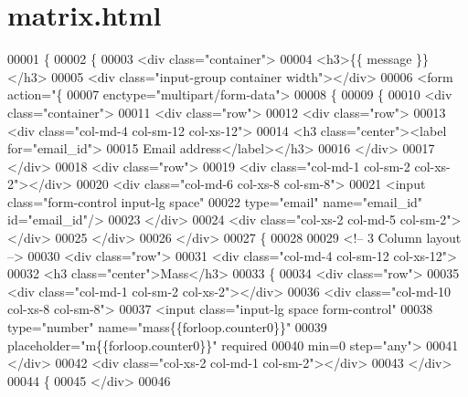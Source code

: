 \hypertarget{matrix_8html_source}{}\section{matrix.\+html}
\label{matrix_8html_source}

\begin{DoxyCode}
00001 \{%
00002 \{%
00003 <div class="container">
00004 <h3>\{\{ message \}\}</h3>
00005 <div class="input-group container width"></div>
00006 <form action="\{%
00007     enctype="multipart/form-data">
00008     \{%
00009     \{%
00010         <div class="container">
00011             <div class="row">
00012                 <div class="row">
00013                     <div class="col-md-4 col-sm-12 col-xs-12"> 
00014                         <h3 class="center"><label for="email\_id">
00015                             Email address</label></h3>
00016                     </div>
00017                 </div>
00018             <div class="row">
00019                 <div class="col-md-1 col-sm-2 col-xs-2"></div>
00020                 <div class="col-md-6 col-xs-8 col-sm-8">
00021                     <input class="form-control input-lg space" 
00022                         type="email" name="email\_id" id="email\_id"/>
00023                 </div>
00024                 <div class="col-xs-2 col-md-5 col-sm-2"></div>
00025             </div>
00026         </div>
00027     \{%
00028 
00029     <!-- 3 Column layout  -->
00030     <div class="row">    
00031         <div class="col-md-4 col-sm-12 col-xs-12">
00032             <h3 class="center">Mass</h3>
00033             \{%
00034             <div class="row">
00035                 <div class="col-md-1 col-sm-2 col-xs-2"></div>
00036                 <div class="col-md-10 col-xs-8 col-sm-8">
00037                     <input class="input-lg space form-control"
00038                         type="number" name="mass\{\{forloop.counter0\}\}"
00039                         placeholder="m\{\{forloop.counter0\}\}" required 
00040                         min=0 step="any">
00041                 </div>
00042                 <div class="col-xs-2 col-md-1 col-sm-2"></div>
00043             </div>
00044             \{%
00045         </div> 
00046         

\end{DoxyCode}
